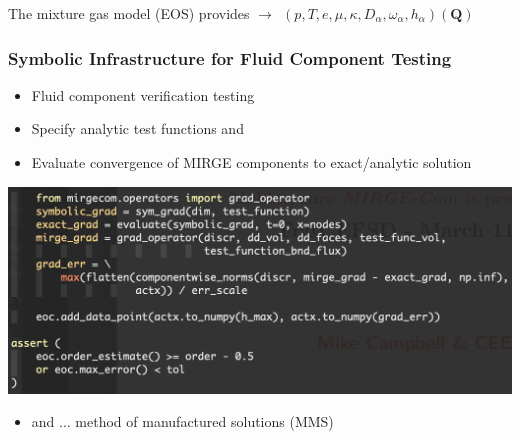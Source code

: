 \begin{frame}
\begin{center}
    The mixture gas model (EOS) provides $\rightarrow~~(p,T,e,\mu,\kappa,D_{\alpha}, \omega_\alpha, h_\alpha)(\mathbf{Q})$
  \end{center}
\end{frame}

\begin{frame}\frametitle{Symbolic Infrastructure for Fluid Component Testing}
\begin{itemize}
\item Fluid component verification testing
\item Specify analytic test functions and 
\item Evaluate convergence of MIRGE components to exact/analytic solution
\end{itemize}
\begin{center}
  \includegraphics[width=.6\textwidth]{Figures/mtc/ComponentVerifCode.png}
\end{center}
\begin{itemize}
\vspace{-10pt}
\item and ... method of manufactured solutions (MMS)
\end{itemize}
\end{frame}

